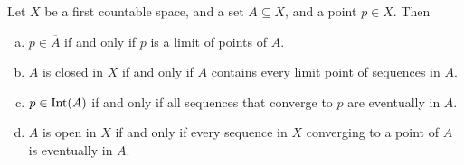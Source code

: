 \begin{lemma}\label{lem: sequence lemma}
  Let \(X\) be a first countable space, and a set \(A \subseteq X\), and a point
  \(p \in X\). Then
  \begin{enumerate}[(a)]
    \item \(p \in \overline A\) if and only if \(p\) is a limit of points of
      \(A\).
    \item \(A\) is closed in \(X\) if and only if \(A\) contains every limit
      point of sequences in \(A\).
    \item \(p \in \operatorname{Int}(A)\) if and only if all sequences that converge to
      \(p\) are eventually in \(A\).
    \item \(A\) is open in \(X\) if and only if every sequence in \(X\) 
      converging to a point of \(A\) is eventually in \(A\).
  \end{enumerate}
\end{lemma}

